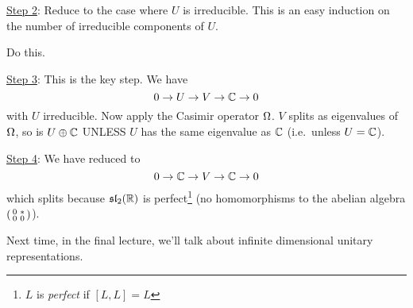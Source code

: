  \underline{Step 2}: Reduce to the case where $U$ is irreducible. This is an easy
 induction on the number of irreducible components of $U$.
 \begin{exercise}
   Do this.
 \end{exercise}

 \underline{Step 3}: This is the key step. We have
 \[
    0\to U\to V\to \mathbb{C}\to 0
 \]
 with $U$ irreducible. Now apply the Casimir operator $\Omega$. $V$ splits as eigenvalues
 of $\Omega$, so is $U\oplus \mathbb{C}$ UNLESS $U$ has the same eigenvalue as $\mathbb{C}$ (i.e.\
 unless $U=\mathbb{C}$).

 \underline{Step 4}: We have reduced to
 \[
    0\to \mathbb{C}\to V\to \mathbb{C}\to 0
 \]
 which splits because $\mathfrak{sl}_2(\mathbb{R})$ is perfect\footnote{$L$ is \emph{perfect} if
 $[L,L]=L$} (no homomorphisms to the abelian algebra $\left( \begin{smallmatrix} 0 & \ast \\ 0 & 0 \end{smallmatrix} \right)$).

 Next time, in the final lecture, we'll talk about infinite dimensional unitary
 representations.
